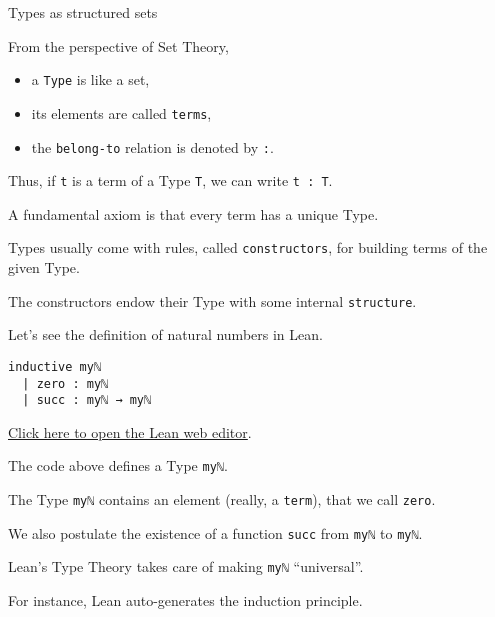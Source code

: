\documentclass{beamer}
\begin{document}
\begin{frame}[fragile]{Types as structured sets}

From the perspective of Set Theory,
\begin{itemize}
\setlength\itemsep{-2em}
\item
  a {\color{violet}\verb`Type`} is like a set,
\setlength\itemsep{-2em}
\item
  its elements are called {\color{violet}\verb`terms`},
\setlength\itemsep{-2em}
\item
  the {\color{violet}\verb`belong-to`} relation is denoted by {\color{violet}\verb`:`}.
\end{itemize}
\bigskip

Thus, if {\color{violet}\verb`t`} is a term of a Type {\color{violet}\verb`T`}, we can write {\color{violet}\verb`t : T`}.
\bigskip

A fundamental axiom is that every term has a unique Type.
\bigskip

Types usually come with rules, called {\color{violet}\verb`constructors`}, for building terms of the given Type.
\bigskip

The constructors endow their Type with some internal {\color{violet}\verb`structure`}.
\bigskip

Let's see the definition of natural numbers in Lean.
\end{frame}

\begin{frame}[fragile]

\begin{verbatim}
inductive myℕ
  | zero : myℕ
  | succ : myℕ → myℕ
\end{verbatim}
{\small{\href{https://leanprover-community.github.io/lean-web-editor/#code=inductive%20my%E2%84%95%0A%20%20%7C%20zero%20%3A%20my%E2%84%95%0A%20%20%7C%20succ%20%3A%20my%E2%84%95%20%E2%86%92%20my%E2%84%95%0A%0A%23print%20prefix%20my%E2%84%95%0A}{Click here to open the Lean web editor}.}}
\bigskip

The code above defines a Type {\color{violet}\verb`myℕ`}.
\bigskip

The Type {\color{violet}\verb`myℕ`} contains an element (really, a {\color{violet}\verb`term`}), that we call {\color{violet}\verb`zero`}.
\bigskip

We also postulate the existence of a function {\color{violet}\verb`succ`} from {\color{violet}\verb`myℕ`} to {\color{violet}\verb`myℕ`}.
\bigskip

Lean's Type Theory takes care of making {\color{violet}\verb`myℕ`} ``universal''.
\bigskip

For instance, Lean auto-generates the induction principle.
\end{frame}
\end{document}
